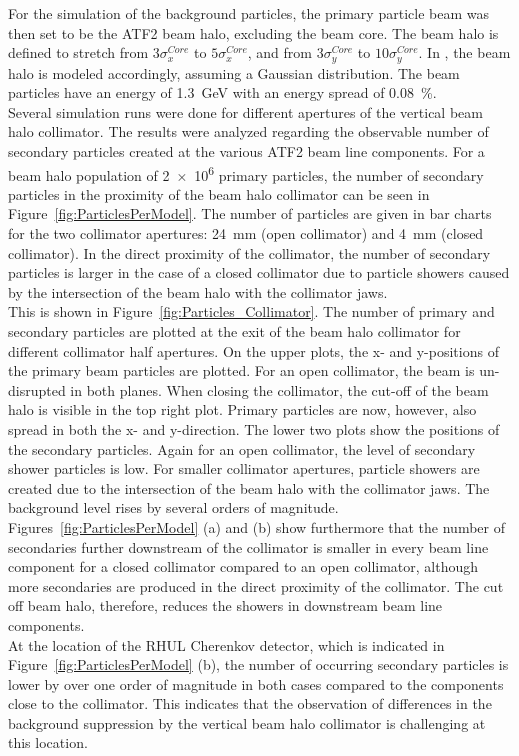 For the \bdsim simulation of the background particles, the primary particle beam was then set to be the ATF2 beam halo, excluding the beam core.
The beam halo is defined to stretch from $3 \sigma^{Core}_x$ to $5 \sigma^{Core}_x$, and from $3 \sigma^{Core}_y$ to $10 \sigma^{Core}_y$.
In \bdsim, the beam halo is modeled accordingly, assuming a Gaussian distribution.
The beam particles have an energy of \SI{1.3}{\GeV} with an energy spread of \SI{0.08}{\percent}.
\\Several \bdsim simulation runs were done for different apertures of the vertical beam halo collimator.
The results were analyzed regarding the observable number of secondary particles created at the various ATF2 beam line components.
For a beam halo population of \num{2e6} primary particles, the number of secondary particles in the proximity of the beam halo collimator can be seen in Figure~\ref{fig:ParticlesPerModel}.
The number of particles are given in bar charts for the two collimator apertures: \SI{24}{\milli\meter} (open collimator) and \SI{4}{\milli\meter} (closed collimator).
In the direct proximity of the collimator, the number of secondary particles is larger in the case of a closed collimator due to particle showers caused by the intersection of the beam halo with the collimator jaws.
\\This is shown in Figure~\ref{fig:Particles_Collimator}.
The number of primary and secondary particles are plotted at the exit of the beam halo collimator for different collimator half apertures.
On the upper plots, the x- and y-positions of the primary beam particles are plotted.
For an open collimator, the beam is un-disrupted in both planes.
When closing the collimator, the cut-off of the beam halo is visible in the top right plot.
Primary particles are now, however, also spread in both the x- and y-direction.
The lower two plots show the positions of the secondary particles.
Again for an open collimator, the level of secondary shower particles is low.
For smaller collimator apertures, particle showers are created due to the intersection of the beam halo with the collimator jaws.
The background level rises by several orders of magnitude.
\\Figures~\ref{fig:ParticlesPerModel} (a) and (b) show furthermore that the number of secondaries further downstream of the collimator is smaller in every beam line component for a closed collimator compared to an open collimator, although more secondaries are produced in the direct proximity of the collimator.
The cut off beam halo, therefore, reduces the showers in downstream beam line components.
\\At the location of the RHUL Cherenkov detector, which is indicated in Figure~\ref{fig:ParticlesPerModel} (b), the number of occurring secondary particles is lower by over one order of magnitude in both cases compared to the components close to the collimator.
This indicates that the observation of differences in the background suppression by the vertical beam halo collimator is challenging at this location.

